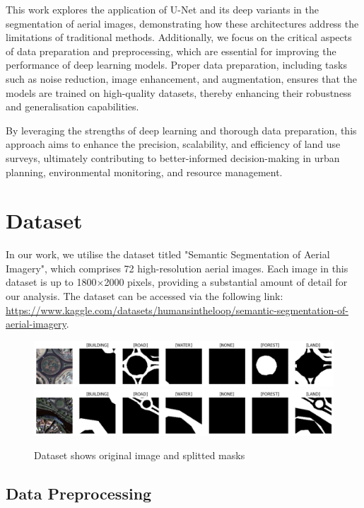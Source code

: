 \documentclass[conference]{IEEEtran}
\begin{document}
This work explores the application of U-Net and its deep variants in the segmentation of aerial images, demonstrating how these architectures address the limitations of traditional methods. Additionally, we focus on the critical aspects of data preparation and preprocessing, which are essential for improving the performance of deep learning models. Proper data preparation, including tasks such as noise reduction, image enhancement, and augmentation, ensures that the models are trained on high-quality datasets, thereby enhancing their robustness and generalisation capabilities.

By leveraging the strengths of deep learning and thorough data preparation, this approach aims to enhance the precision, scalability, and efficiency of land use surveys, ultimately contributing to better-informed decision-making in urban planning, environmental monitoring, and resource management.

\section{Dataset}
In our work, we utilise the dataset titled "Semantic Segmentation of Aerial Imagery", which comprises 72 high-resolution aerial images. Each image in this dataset is up to 1800$\times$2000 pixels, providing a substantial amount of detail for our analysis. The dataset can be accessed via the following link: \href{https://www.kaggle.com/datasets/humansintheloop/semantic-segmentation-of-aerial-imagery}{https://www.kaggle.com/datasets/humansintheloop/semantic-segmentation-of-aerial-imagery}.

\begin{figure}[!h]
    \centering
    \includegraphics[width=\textwidth]{data_prep.png}
    \includegraphics[width=\textwidth]{data_prep2.png}
    \caption{Dataset shows original image and splitted masks}
    \label{fig:data_set}
\end{figure}

\subsection*{Data Preprocessing}
\end{document}
